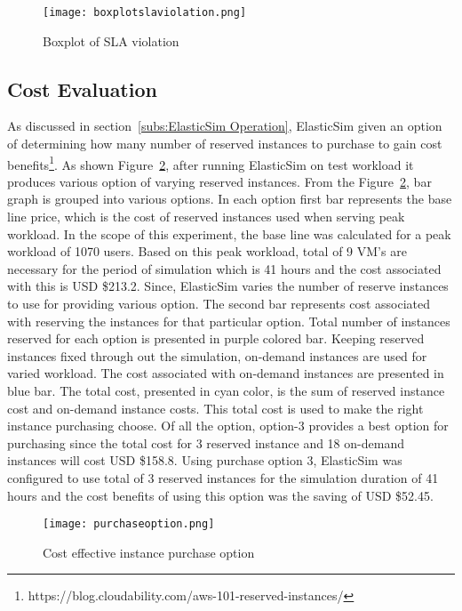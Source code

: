 \begin{figure}[h]
  \begin{center}
    \texttt{[image: boxplotslaviolation.png]}
    \caption{Boxplot of SLA violation}
    \label{figure:boxplotslaviolation}
  \end{center}
\end{figure}
\subsection{Cost Evaluation}
\label{sub:Cost Evaluation}
As discussed in section~\ref{subs:ElasticSim Operation}, ElasticSim given an option of determining how many number of reserved instances to purchase to gain cost benefits\footnote{https://blog.cloudability.com/aws-101-reserved-instances/}. As shown Figure~\ref{figure:purchaseoption}, after running ElasticSim on test workload it produces various option of varying reserved instances. From the Figure~\ref{figure:purchaseoption}, bar graph is grouped into various options. In each option first bar represents the base line price, which is the cost of reserved instances used when serving peak workload. In the scope of this experiment, the base line was calculated for a peak workload of 1070 users. Based on this peak workload, total of 9 VM's are necessary for the period of simulation which is 41 hours and the cost associated with this is USD \$213.2. Since, ElasticSim varies the number of reserve instances to use for providing various option. The second bar represents cost associated with reserving the instances for that particular option. Total number of instances reserved for each option is presented in purple colored bar. Keeping reserved instances fixed through out the simulation, on-demand instances are used for varied workload. The cost associated with on-demand instances are presented in blue bar. The total cost, presented in cyan color, is the sum of reserved instance cost and on-demand instance costs. This total cost is used to make the right instance purchasing choose. Of all the option, option-3 provides a best option for purchasing since the total cost for 3 reserved instance and 18 on-demand instances will cost USD \$158.8. Using purchase option 3, ElasticSim was configured to use total of 3 reserved instances for the simulation duration of 41 hours and the cost benefits of using this option was the saving of USD \$52.45.
\begin{figure}[h]
  \begin{center}
    \texttt{[image: purchaseoption.png]}
    \caption{Cost effective instance purchase option}
    \label{figure:purchaseoption}
  \end{center}
\end{figure}

